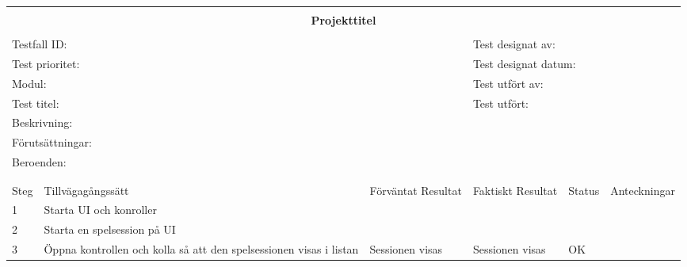 \documentclass[10pt]{article}
\begin{document}
\begin{tabular}{| p{1cm}|  p{3cm} | p{3cm}| p{3cm}| p{2cm}| p{3cm}|}


	\hline
	\multicolumn{6}{|l|}{}\\
	\multicolumn{6}{|c|}{\huge{\textbf{Projekttitel}}}\\
	\multicolumn{6}{|l|}{}\\
	\hline
	\multicolumn{3}{|l|}{Testfall ID:}&\multicolumn{3}{|l|}{Test designat av:}\\
	\hline
	\multicolumn{3}{|l|}{Test prioritet:}&\multicolumn{3}{|l|}{Test designat datum:}\\
	\hline
	\multicolumn{3}{|l|}{Modul:}&\multicolumn{3}{|l|}{Test utfört av:}\\
	\hline
	\multicolumn{3}{|l|}{Test titel:}&\multicolumn{3}{|l|}{Test utfört:}\\
	\hline
	\multicolumn{3}{|l|}{Beskrivning:}&\multicolumn{3}{|l|}{}\\
	\hline
	\multicolumn{6}{|l|}{Förutsättningar:}\\
	\hline
	\multicolumn{6}{|l|}{Beroenden:}\\
	
	\hline
	\multicolumn{6}{|l|}{}\\
	\multicolumn{6}{|l|}{}\\
      	\hline
	Steg&Tillvägagångssätt&Förväntat Resultat&Faktiskt Resultat&Status&Anteckningar \\
	\hline
	1&Starta UI och konroller&&&&\\
      	\hline
	2&Starta en spelsession på UI&&&&\\
      	\hline
	3&Öppna kontrollen och kolla så att den spelsessionen visas i listan&Sessionen visas&Sessionen visas&OK&\\
      	\hline
\end{tabular}
\end{document}
